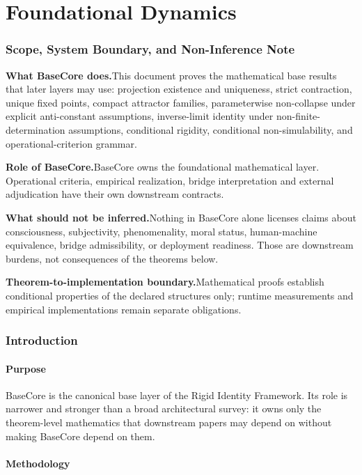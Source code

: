 \part{Foundational Dynamics}
\section{Scope, System Boundary, and Non-Inference Note}

\noindent\textbf{What BaseCore does.}\enspace This document proves the mathematical base results that later layers may use: projection existence and uniqueness, strict contraction, unique fixed points, compact attractor families, parameterwise non-collapse under explicit anti-constant assumptions, inverse-limit identity under non-finite-determination assumptions, conditional rigidity, conditional non-simulability, and operational-criterion grammar.

\noindent\textbf{Role of BaseCore.}\enspace BaseCore owns the foundational mathematical layer. Operational criteria, empirical realization, bridge interpretation and external adjudication have their own downstream contracts.

\noindent\textbf{What should not be inferred.}\enspace Nothing in BaseCore alone licenses claims about consciousness, subjectivity, phenomenality, moral status, human-machine equivalence, bridge admissibility, or deployment readiness. Those are downstream burdens, not consequences of the theorems below.

\noindent\textbf{Theorem-to-implementation boundary.}\enspace Mathematical proofs establish conditional properties of the declared structures only; runtime measurements and empirical implementations remain separate obligations.

\section{Introduction}

\subsection{Purpose}

BaseCore is the canonical base layer of the Rigid Identity Framework. Its role is narrower and stronger than a broad architectural survey: it owns only the theorem-level mathematics that downstream papers may depend on without making BaseCore depend on them.

\subsection{Methodology}

